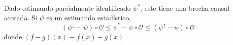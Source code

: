 \begin{corolario}
	Dado estimando parcialmente identificado $\psi^*$, este tiene una brecha causal acotada.
	Si $\psi$ es un estimando estadístico,
	$$
		(\psi^\downarrow - \psi)\circ \mathcal{O} \leq \psi^* - \psi \circ \mathcal{O} \leq (\psi^\uparrow - \psi) \circ \mathcal{O}
	$$
	donde $(f - g)(x) \equiv f(x) - g(x)$
\end{corolario}
